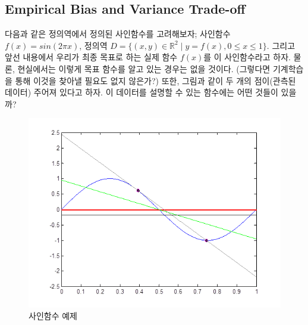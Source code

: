 \documentclass[a4paper]{oblivoir}
\begin{document}
\subsection{Empirical Bias and Variance Trade-off}
다음과 같은 정의역에서 정의된 사인함수를 고려해보자; 사인함수 $f(x) = sin(2 \pi x)$, 정의역 $D=\{ (x,y) \in \mathds{R}^{2} \mid y=f(x), 0 \leq x \leq 1 \}$. 그리고 앞선 내용에서 우리가 최종 목표로 하는 실제 함수 $f(x)$를 이 사인함수라고 하자. 물론, 현실에서는 이렇게 목표 함수를 알고 있는 경우는 없을 것이다. (그렇다면 기계학습을 통해 이것을 찾아낼 필요도 없지 않은가?) 또한, 그림과 같이 두 개의 점이(관측된 데이터) 주어져 있다고 하자. 이 데이터를 설명할 수 있는 함수에는 어떤 것들이 있을까?
\begin{figure}[ht]
\centering
\includegraphics[scale=0.65]{BV_Tradeoff.png}
\caption{사인함수 예제}
\label{Figure 6-3}
\end{figure}
\end{document}
